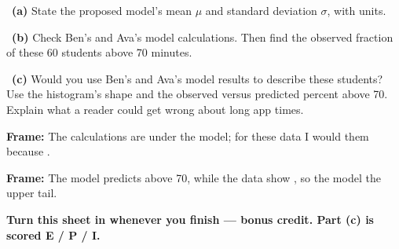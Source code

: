 \documentclass[11pt]{article}
\begin{document}
~\textbf{(a)} State the proposed model's mean $\mu$ and standard deviation $\sigma$, with units.\par
\workspace{0.7in}

~\textbf{(b)} Check Ben's and Ava's model calculations. Then find the observed fraction of these 60 students above 70 minutes.\par
\workspace{1.4in}

~\textbf{(c)} Would you use Ben's and Ava's model results to describe these students? Use the histogram's shape and the observed versus predicted percent above 70. Explain what a reader could get wrong about long app times.\par
\workspace{2.0in}

\begin{sentenceframebox}\raggedright\textbf{Frame:} The calculations are \blank[0.9in] under the model; for these data I would \blank[1in] them because \blank[2in].\end{sentenceframebox}

\begin{sentenceframebox}\raggedright\textbf{Frame:} The model predicts \blank[0.7in] above 70, while the data show \blank[1in], so the model \blank[1.3in] the upper tail.\end{sentenceframebox}

\textbf{Turn this sheet in whenever you finish --- bonus credit. Part (c) is scored E / P / I.}\par
\end{document}
